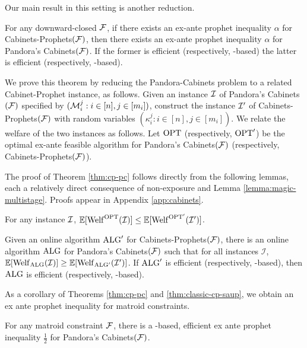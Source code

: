 Our main result in this setting is another reduction.
\begin{theorem} \label{thm:cp-pc}
  For any downward-closed $\mathcal{F}$, if there exists an ex-ante prophet inequality $\alpha$ for Cabinets-Prophets$(\mathcal{F})$, then there exists an ex-ante prophet inequality $\alpha$ for Pandora's Cabinets$(\mathcal{F})$.
  If the former is efficient (respectively, \SAUP-based) the latter is efficient (respectively, \SAUP-based).
\end{theorem}
We prove this theorem by reducing the Pandora-Cabinets problem to a related Cabinet-Prophet instance, as follows.
Given an instance $\mathcal{I}$ of Pandora's Cabinets$(\mathcal{F})$ specified by $(\mathcal{M}_i^j : i \in [n], j \in [m_i])$, construct the instance $\mathcal{I}'$ of Cabinets-Prophets$(\mathcal{F})$ with random variables $(\kappa_i^j : i \in [n], j \in [m_i])$.
We relate the welfare of the two instances as follows.
Let $\mathrm{OPT}$ (respectively, $\mathrm{OPT}'$) be the optimal ex-ante feasible algorithm for Pandora's Cabinets$(\mathcal{F})$ (respectively, Cabinets-Prophets$(\mathcal{F})$).

The proof of Theorem \ref{thm:cp-pc} follows directly from the following lemmas, each a relatively direct consequence of non-exposure and Lemma \ref{lemma:magic-multistage}.
Proofs appear in Appendix \ref{app:cabinets}.
\begin{lemma} \label{lemma:cabinets-opt-upper}
	For any instance $\mathcal{I}$, $\operatorname*{\mathbb{E}}[ \mathrm{Welf}^{\mathrm{OPT}}(\mathcal{I})] \leq \operatorname*{\mathbb{E}}[ \mathrm{Welf}^{\mathrm{OPT}'}(\mathcal{I}') ]$.
\end{lemma}

\begin{lemma} \label{lemma:cabinets-alg-lower}
	Given an online algorithm $\mathrm{ALG}'$ for Cabinets-Prophets$(\mathcal{F})$, there is an online algorithm $\mathrm{ALG}$ for Pandora's Cabinets$(\mathcal{F})$ such that for all instances $\mathcal{I}$, $\operatorname*{\mathbb{E}}[ \mathrm{Welf}_{\mathrm{ALG}}(\mathcal{I}) ] \geq \operatorname*{\mathbb{E}}[ \mathrm{Welf}_{\mathrm{ALG}'}(\mathcal{I'}) ]$.
	If $\mathrm{ALG}'$ is efficient (respectively, \SAUP-based), then $\mathrm{ALG}$ is efficient (respectively, \SAUP-based).
\end{lemma}

As a corollary of Theorems \ref{thm:cp-pc} and \ref{thm:classic-cp-saup}, we obtain an ex ante prophet inequality for matroid constraints.
\begin{corollary}\label{cor:cp-saup}
	For any matroid constraint $\mathcal{F}$, there is a \SAUP{}-based, efficient ex ante prophet inequality $\tfrac{1}{2}$ for Pandora's Cabinets$(\mathcal{F})$.
\end{corollary}





